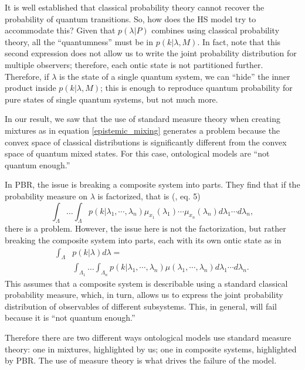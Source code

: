 \documentclass[10pt,twocolumn, nofootinbib]{revtex4-2}
\begin{document}
It is well established that classical probability theory cannot recover the probability of quantum transitions. So, how does the HS model try to accommodate this? Given that $p(\lambda|P)$ combines using classical probability theory, all the ``quantumness'' must be in $p(k|\lambda, M)$. In fact, note that this second expression does not allow us to write the joint probability distribution for multiple observers; therefore, each ontic state is not partitioned further. Therefore, if $\lambda$ is the state of a single quantum system, we can ``hide'' the inner product inside $p(k|\lambda, M)$; this is enough to reproduce quantum probability for pure states of single quantum systems, but not much more.

In our result, we saw that the use of standard measure theory when creating mixtures as in equation \ref{epistemic_mixing} generates a problem because the convex space of classical distributions is significantly different from the convex space of quantum mixed states. For this case, ontological models are ``not quantum enough.''

In PBR, the issue is breaking a composite system into parts. They find  that if the probability measure on $\lambda$ is factorized, that is (\cite{PBR:2012}, eq. 5) 
\begin{equation}
	\int_{\Lambda} \dots \int_{\Lambda} p(k | \lambda_1, \cdots, \lambda_n) \mu_{x_1}(\lambda_1)\cdots\mu_{x_n}(\lambda_n) d\lambda_1 \cdots d\lambda_n ,
\end{equation}
there is a problem. However, the issue here is not the factorization, but rather breaking the composite system into parts, each with its own ontic state as in 
\begin{equation}
	\begin{aligned}
	\int_\Lambda &p(k | \lambda) d\lambda = \\
	&\int_{\Lambda_1} \dots \int_{\Lambda_n} p(k | \lambda_1, \cdots, \lambda_n) \mu(\lambda_1, \cdots, \lambda_n) d\lambda_1 \cdots d\lambda_n.
	\end{aligned}
\end{equation}
This assumes that a composite system is describable using a standard classical probability measure, which, in turn, allows us to express the joint probability distribution of observables of different subsystems. This, in general, will fail because it is ``not quantum enough.''

Therefore there are two different ways ontological models use standard measure theory: one in mixtures, highlighted by us; one in composite systems, highlighted by PBR. The use of measure theory is what drives the failure of the model.
\end{document}
